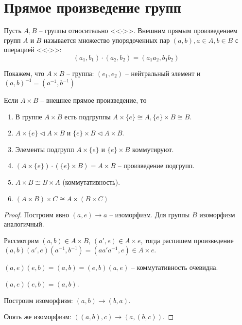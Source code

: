 \section{Прямое произведение групп}
\begin{definition}
    Пусть $A, B$ -- группы относительно <<$\cdot$>>. Внешним прямым произведением групп $A$ и $B$ называется множество упорядоченных пар $(a, b), a \in A, b \in B$ с операцией <<$\cdot$>>:
    $$(a_1, b_1) \cdot (a_2, b_2) = (a_1a_2, b_1b_2)$$
\end{definition}

\begin{note}
    Покажем, что $A \times B$ -- группа: $(e_1, e_2)$ -- нейтральный элемент и $(a, b)^{-1} = (a^{-1}, b^{-1})$
\end{note}

\begin{proposition}
\label{pr6.1}
    Если $A \times B$ -- внешнее прямое произведение, то 
    \begin{enumerate}
        \item В группе $A \times B$ есть подгруппы $A \times \{ e \} \cong A, \{ e \} \times B \cong B$.
        \item $A \times \{ e \} \lhd A \times B$ и $\{ e \} \times B \lhd A \times B$.
        \item Элементы подгрупп $A \times \{ e \}$ и $\{ e \} \times B$ коммутируют.
        \item $(A \times \{ e \}) \cdot (\{ e \} \times B) = A \times B$ -- произведение подгрупп.
        \item $A \times B \cong B \times A$ (коммутативность).
        \item $(A \times B) \times C \cong A \times (B \times C)$
    \end{enumerate}
\end{proposition}

\begin{proof}
    \item Построим явно $(a, e) \to a$ -- изоморфизм. Для группы $B$ изоморфизм аналогичный.
    \item Рассмотрим $(a, b) \in A \times B$, $(a', e) \in A \times e$, тогда распишем произведение $(a, b)(a', e)(a^{-1}, b^{-1}) = (aa'a^{-1}, e) \in A \times e$.
    \item $(a, e)(e, b) = (a, b) = (e, b)(a, e)$ -- коммутативность очевидна.
    \item $(a, e)(e, b) = (a, b)$.
    \item Построим изоморфизм: $(a, b) \to (b, a)$.
    \item Опять же изоморфизм: $((a, b), c) \to (a, (b, c))$.
\end{proof}

